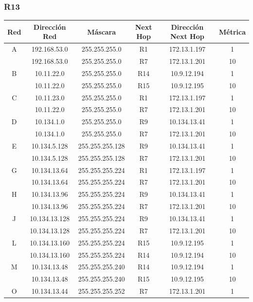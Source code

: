 \documentclass[12pt, a4paper, spanish]{article}
\begin{document}
\subsubsection{R13}
\begin{center}
\begin{tabular}{|c|c|c|c|c|c|}
	\hline
	Red & Dirección Red & Máscara & Next Hop & Dirección Next Hop & Métrica \\
	\hline
	\hline
	A & 192.168.53.0 & 255.255.255.0 & R1 & 172.13.1.197 & 1\\
	 & 192.168.53.0 & 255.255.255.0 & R7 & 172.13.1.201 & 10\\
	\hline
	B & 10.11.22.0 & 255.255.255.0 & R14 & 10.9.12.194 & 1\\
	 & 10.11.22.0 & 255.255.255.0 & R15 & 10.9.12.195 & 10\\
	\hline
	C & 10.11.23.0 & 255.255.255.0 & R1 & 172.13.1.197 & 1\\
	 & 10.11.22.0 & 255.255.255.0 & R7 & 172.13.1.201 & 10\\
	\hline
	D & 10.134.1.0 & 255.255.255.0 & R9 & 10.134.13.41 & 1\\
	 & 10.134.1.0 & 255.255.255.0 & R7 & 172.13.1.201 & 10\\
	\hline
	E & 10.134.5.128 & 255.255.255.128 & R9 & 10.134.13.41 & 1\\
	 & 10.134.5.128 & 255.255.255.128 & R7 & 172.13.1.201 & 10\\
	\hline
	G & 10.134.13.64 & 255.255.255.224 & R1 & 172.13.1.197 & 1\\
	 & 10.134.13.64 & 255.255.255.224 & R7 & 172.13.1.201 & 10\\
	\hline
	H & 10.134.13.96 & 255.255.255.224 & R9 & 10.134.13.41 & 1\\
	 & 10.134.13.96 & 255.255.255.224 & R7 & 172.13.1.201 & 10\\
	\hline
	J & 10.134.13.128 & 255.255.255.224 & R9 & 10.134.13.41 & 1\\
	 & 10.134.13.128 & 255.255.255.224 & R7 & 172.13.1.201 & 10\\
	\hline
	L & 10.134.13.160 & 255.255.255.224 & R15 & 10.9.12.195 & 1\\
	 & 10.134.13.160 & 255.255.255.224 & R14 & 10.9.12.194 & 10\\
	\hline
	M & 10.134.13.48 & 255.255.255.240 & R14 & 10.9.12.194 & 1\\
	 & 10.134.13.48 & 255.255.255.240 & R15 & 10.9.12.195 & 10\\
	\hline
	O & 10.134.13.44 & 255.255.255.252 & R7 & 172.13.1.201 & 1\\

\end{tabular}
\end{center}
\end{document}
